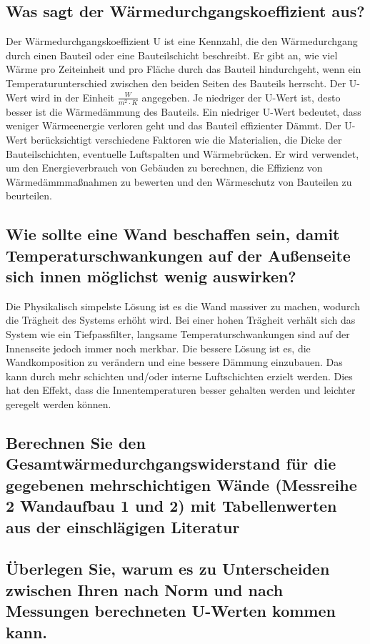 \subsection{Was sagt der Wärmedurchgangskoeffizient aus?}
Der Wärmedurchgangskoeffizient U ist eine Kennzahl, die den Wärmedurchgang durch einen Bauteil oder eine Bauteilschicht beschreibt. 
Er gibt an, wie viel Wärme pro Zeiteinheit und pro Fläche durch das Bauteil hindurchgeht, wenn ein Temperaturunterschied zwischen den beiden Seiten des Bauteils herrscht.
Der U-Wert wird in der Einheit $\frac{W}{m^2 \cdot K}$ angegeben. Je niedriger der U-Wert ist, desto besser ist die Wärmedämmung des Bauteils. 
Ein niedriger U-Wert bedeutet, dass weniger Wärmeenergie verloren geht und das Bauteil effizienter Dämmt.
Der U-Wert berücksichtigt verschiedene Faktoren wie die Materialien, die Dicke der Bauteilschichten, eventuelle Luftspalten und Wärmebrücken. 
Er wird verwendet, um den Energieverbrauch von Gebäuden zu berechnen, die Effizienz von Wärmedämmmaßnahmen zu bewerten und den Wärmeschutz von Bauteilen zu beurteilen.
\subsection{Wie sollte eine Wand beschaffen sein, damit Temperaturschwankungen auf der Außenseite sich innen möglichst wenig auswirken?}
Die Physikalisch simpelste Lösung ist es die Wand massiver zu machen, wodurch die Trägheit des Systems erhöht wird.
Bei einer hohen Trägheit verhält sich das System wie ein Tiefpassfilter, langsame Temperaturschwankungen sind auf der Innenseite jedoch immer noch merkbar.
Die bessere Lösung ist es, die Wandkomposition zu verändern und eine bessere Dämmung einzubauen.
Das kann durch mehr schichten und/oder interne Luftschichten erzielt werden.
Dies hat den Effekt, dass die Innentemperaturen besser gehalten werden und leichter geregelt werden können.
\subsection{Berechnen Sie den Gesamtwärmedurchgangswiderstand für die gegebenen mehrschichtigen Wände (Messreihe 2 Wandaufbau 1 und 2) mit Tabellenwerten aus der einschlägigen Literatur}
\subsection{Überlegen Sie, warum es zu Unterscheiden zwischen Ihren nach Norm und nach Messungen berechneten U-Werten kommen kann.}